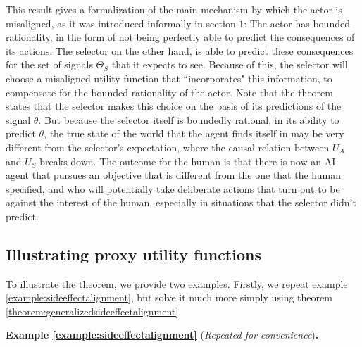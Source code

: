\begin{remark*}
	
	\textnormal{This result gives a formalization of the main mechanism by which the actor is misaligned, as it was introduced informally in section $1$: The actor has bounded rationality, in the form of not being perfectly able to predict the consequences of its actions. The selector on the other hand, is able to predict these consequences for the set of signals $\Theta_S$ that it expects to see. Because of this, the selector will choose a misaligned utility function that ``incorporates" this information, to compensate for the bounded rationality of the actor. Note that the theorem states that the selector makes this choice on the basis of its predictions of the signal $\theta$. But because the selector itself is boundedly rational, in its ability to predict $\theta$, the true state of the world that the agent finds itself in may be very different from the selector's expectation, where the causal relation between $U_A$ and $U_S$ breaks down. The outcome for the human is that there is now an AI agent that pursues an objective that is different from the one that the human specified, and who will potentially take deliberate actions that turn out to be against the interest of the human, especially in situations that the selector didn't predict.}	
	
	
	
	
	
\end{remark*}



\subsection{Illustrating proxy utility functions}
To illustrate the theorem, we provide two examples. Firstly, we repeat example \ref{example:sideeffectalignment}, but solve it much more simply using theorem \ref{theorem:generalizedsideeffectalignment}.

\medskip
\noindent \textbf{Example \ref{example:sideeffectalignment}} (\textit{Repeated for convenience})\textbf{.} \textnormal{\examplesideffectalignment}

